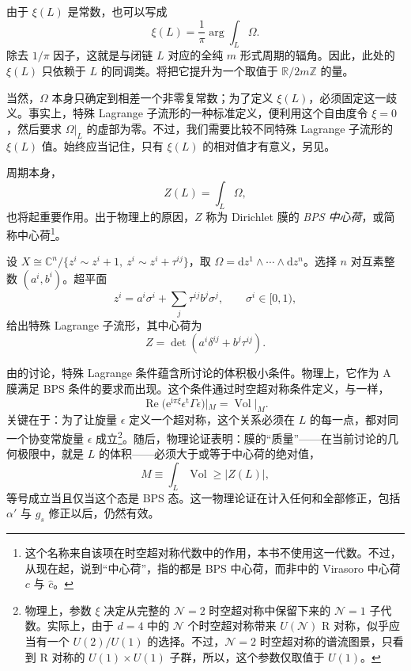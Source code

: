 由于 $\xi(L)$ 是常数，也可以写成
\begin{equation}\label{eq:5.16}
\xi(L)=\frac{1}{\pi}\arg\int_L\Omega.
\end{equation}
除去 $1/\pi$ 因子，这就是与闭链 $L$ 对应的全纯 $m$ 形式周期的辐角。因此，此处的 $\xi(L)$ 只依赖于 $L$ 的同调类。将把它提升为一个取值于 $\mathbb{R}/2m\mathbb{Z}$ 的量。

当然，$\Omega$ 本身只确定到相差一个非零复常数；为了定义 $\xi(L)$，必须固定这一歧义。事实上，特殊 Lagrange 子流形的一种标准定义，便利用这个自由度令 $\xi=0$，然后要求 $\Omega|_L$ 的虚部为零。不过，我们需要比较不同特殊 Lagrange 子流形的 $\xi(L)$ 值。始终应当记住，只有 $\xi(L)$ 的相对值才有意义，另见。

周期本身，
\begin{equation}\label{eq:5.17}
Z(L)=\int_L\Omega,
\end{equation}
也将起重要作用。出于物理上的原因，$Z$ 称为 Dirichlet 膜的 \emph{BPS 中心荷}，或简称中心荷\footnote{这个名称来自该项在时空超对称代数中的作用，本书不使用这一代数。不过，从现在起，说到“中心荷”，指的都是 BPS 中心荷，而非中的 Virasoro 中心荷 $c$ 与 $\hat c$。}。

\begin{example}[复环面]\label{ex:5.4}
设 $X\cong\mathbb{C}^n/\{z^i\sim z^i+1,\ z^i\sim z^i+\tau^{ij}\}$，取 $\Omega=\mathrm{d}z^1\wedge\cdots\wedge\mathrm{d}z^n$。选择 $n$ 对互素整数 $(a^i,b^i)$。超平面
\[
z^i=a^i\sigma^i+\sum_j\tau^{ij}b^j\sigma^j,\qquad \sigma^i\in[0,1),
\]
给出特殊 Lagrange 子流形，其中心荷为
\[
Z=\det(a^i\delta^{ij}+b^j\tau^{ij}).
\]
\end{example}

由的讨论，特殊 Lagrange 条件蕴含所讨论的体积极小条件。物理上，它作为 A 膜满足 BPS 条件的要求而出现。这个条件通过时空超对称条件定义，与一样，
\[
\operatorname{Re}\bigl(\mathrm{e}^{\mathrm{i}\pi\xi}\epsilon^{\mathrm t}\Gamma\epsilon\bigr)|_M
=\operatorname{Vol}|_M.
\]
关键在于：为了让旋量 $\epsilon$ 定义一个超对称，这个关系必须在 $L$ 的每一点，都对同一个协变常旋量 $\epsilon$ 成立\footnote{物理上，参数 $\xi$ 决定从完整的 $\mathcal{N}=2$ 时空超对称中保留下来的 $\mathcal{N}=1$ 子代数。实际上，由于 $d=4$ 中的 $\mathcal{N}$ 个时空超对称带来 $U(\mathcal{N})$ R 对称，似乎应当有一个 $U(2)/U(1)$ 的选择。不过，$\mathcal{N}=2$ 时空超对称的谱流图景，只看到 R 对称的 $U(1)\times U(1)$ 子群，所以，这个参数仅取值于 $U(1)$。}。随后，物理论证表明：膜的“质量”——在当前讨论的几何极限中，就是 $L$ 的体积——必须大于或等于中心荷的绝对值，
\begin{equation}\label{eq:5.18}
M\equiv\int_L\operatorname{Vol}\ge |Z(L)|,
\end{equation}
等号成立当且仅当这个态是 BPS 态。这一物理论证在计入任何和全部修正，包括 $\alpha'$ 与 $g_s$ 修正以后，仍然有效。

